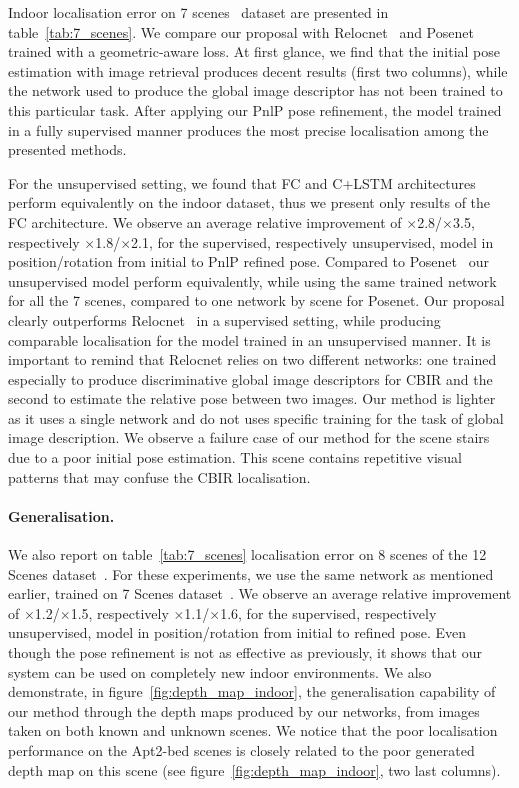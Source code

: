 

Indoor localisation error on 7 scenes~\citep{Shotton2013} dataset are presented in table~\ref{tab:7_scenes}. We compare our proposal with Relocnet~\citep{Purkait2018} and Posenet~\citep{Kendall2017} trained with a geometric-aware loss. At first glance, we find that the initial pose estimation with image retrieval produces decent results (first two columns), while the network used to produce the global image descriptor has not been trained to this particular task. After applying our PnlP pose refinement, the model trained in a fully supervised manner produces the most precise localisation among the presented methods. 

For the unsupervised setting, we found that FC and C+LSTM architectures perform equivalently on the indoor dataset, thus we present only results of the FC architecture. We observe an average relative improvement of $\times$2.8/$\times$3.5, respectively $\times$1.8/$\times$2.1, for the supervised, respectively unsupervised, model in position/rotation from initial to PnlP refined pose. Compared to Posenet~\citep{Kendall2017} our unsupervised model perform equivalently, while using the same trained network for all the 7 scenes, compared to one network by scene for Posenet. Our proposal clearly outperforms Relocnet~\citep{Balntas2018} in a supervised setting, while producing comparable localisation for the model trained in an unsupervised manner. It is important to remind that Relocnet relies on two different networks: one trained especially to produce discriminative global image descriptors for CBIR and the second to estimate the relative pose between two images. Our method is lighter as it uses a single network and do not uses specific training for the task of global image description. We observe a failure case of our method for the scene stairs due to a poor initial pose estimation. This scene contains repetitive visual patterns that may confuse the CBIR localisation.

\paragraph{Generalisation.} We also report on table~\ref{tab:7_scenes} localisation error on 8 scenes of the 12 Scenes dataset~\citep{Valentin2016}. For these experiments, we use the same network as mentioned earlier, trained on 7 Scenes dataset~\citep{Shotton2013}. We observe an average relative improvement of $\times$1.2/$\times$1.5, respectively $\times$1.1/$\times$1.6, for the supervised, respectively unsupervised, model in position/rotation from initial to refined pose. Even though the pose refinement is not as effective as previously, it shows that our system can be used on completely new indoor environments. We also demonstrate, in figure~\ref{fig:depth_map_indoor}, the generalisation capability of our method through the depth maps produced by our networks, from images taken on both known and unknown scenes. We notice that the poor localisation performance on the Apt2-bed scenes is closely related to the poor generated depth map on this scene (see figure~\ref{fig:depth_map_indoor}, two last columns).

